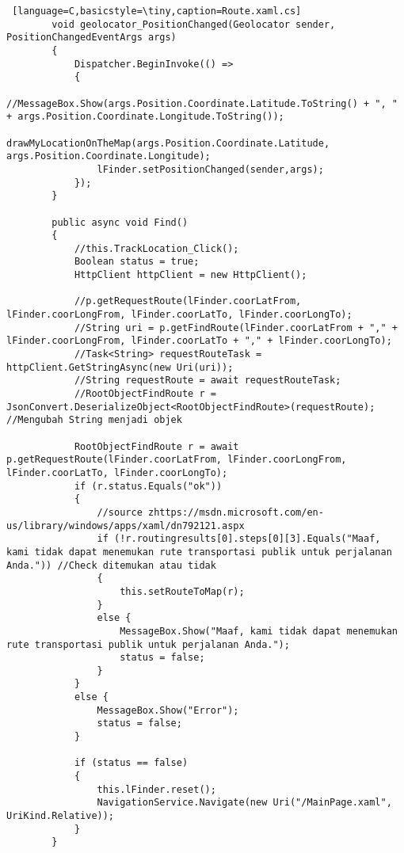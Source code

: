 \begin{lstlisting} [language=C,basicstyle=\tiny,caption=Route.xaml.cs]
        void geolocator_PositionChanged(Geolocator sender, PositionChangedEventArgs args)
        {
            Dispatcher.BeginInvoke(() =>
            {
                //MessageBox.Show(args.Position.Coordinate.Latitude.ToString() + ", " + args.Position.Coordinate.Longitude.ToString());
                drawMyLocationOnTheMap(args.Position.Coordinate.Latitude, args.Position.Coordinate.Longitude);
                lFinder.setPositionChanged(sender,args);
            });
        }

        public async void Find()
        {
            //this.TrackLocation_Click();
            Boolean status = true; 
            HttpClient httpClient = new HttpClient();
            
            //p.getRequestRoute(lFinder.coorLatFrom, lFinder.coorLongFrom, lFinder.coorLatTo, lFinder.coorLongTo);
            //String uri = p.getFindRoute(lFinder.coorLatFrom + "," + lFinder.coorLongFrom, lFinder.coorLatTo + "," + lFinder.coorLongTo);
            //Task<String> requestRouteTask = httpClient.GetStringAsync(new Uri(uri));
            //String requestRoute = await requestRouteTask;
            //RootObjectFindRoute r = JsonConvert.DeserializeObject<RootObjectFindRoute>(requestRoute); //Mengubah String menjadi objek

            RootObjectFindRoute r = await p.getRequestRoute(lFinder.coorLatFrom, lFinder.coorLongFrom, lFinder.coorLatTo, lFinder.coorLongTo);
            if (r.status.Equals("ok"))
            {
                //source zhttps://msdn.microsoft.com/en-us/library/windows/apps/xaml/dn792121.aspx 
                if (!r.routingresults[0].steps[0][3].Equals("Maaf, kami tidak dapat menemukan rute transportasi publik untuk perjalanan Anda.")) //Check ditemukan atau tidak
                {
                    this.setRouteToMap(r);
                }
                else {
                    MessageBox.Show("Maaf, kami tidak dapat menemukan rute transportasi publik untuk perjalanan Anda.");
                    status = false; 
                }
            }
            else {
                MessageBox.Show("Error");
                status = false; 
            }

            if (status == false)
            {
                this.lFinder.reset();
                NavigationService.Navigate(new Uri("/MainPage.xaml", UriKind.Relative));
            }
        }


\end{lstlisting}
